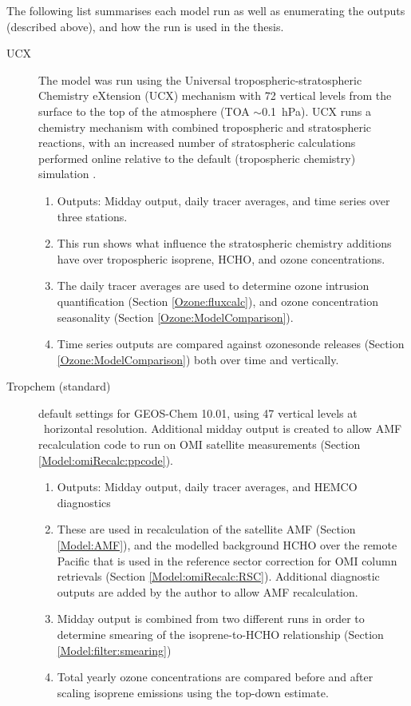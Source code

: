   The following list summarises each model run as well as enumerating the outputs (described above), and how the run is used in the thesis.
  \begin{description}
    \item[UCX]%
    The model was run using the Universal tropospheric-stratospheric Chemistry eXtension (UCX) mechanism with 72 vertical levels from the surface to the top of the atmosphere (TOA $\sim$0.1~hPa).
    UCX runs a chemistry mechanism with combined tropospheric and stratospheric reactions, with an increased number of stratospheric calculations performed online relative to the default (tropospheric chemistry) simulation \parencite{Eastham2014}.
    \begin{enumerate}
      \item Outputs: Midday output, daily tracer averages, and time series over three stations.
      \item This run shows what influence the stratospheric chemistry additions have over tropospheric isoprene, HCHO, and ozone concentrations.
      \item The daily tracer averages are used to determine ozone intrusion quantification (Section \ref{Ozone:fluxcalc}), and ozone concentration seasonality (Section \ref{Ozone:ModelComparison}).
      \item Time series outputs are compared against ozonesonde releases (Section \ref{Ozone:ModelComparison}) both over time and vertically.
    \end{enumerate}
    
    \item [Tropchem (standard)]%
    default settings for GEOS-Chem 10.01, using 47 vertical levels at \lowhr ~horizontal resolution.
    Additional midday output is created to allow AMF recalculation code to run on OMI satellite measurements (Section \ref{Model:omiRecalc:ppcode}).
    \begin{enumerate}
      \item Outputs: Midday output, daily tracer averages, and HEMCO diagnostics
      \item These are used in recalculation of the satellite AMF (Section \ref{Model:AMF}), and the modelled background HCHO over the remote Pacific that is used in the reference sector correction for OMI column retrievals (Section \ref{Model:omiRecalc:RSC}).
      Additional diagnostic outputs are added by the author to allow AMF recalculation.
      \item Midday output is combined from two different runs in order to determine smearing of the isoprene-to-HCHO relationship (Section \ref{Model:filter:smearing})
      \item Total yearly ozone concentrations are compared before and after scaling isoprene emissions using the top-down estimate.
    \end{enumerate}
    

\end{description}
